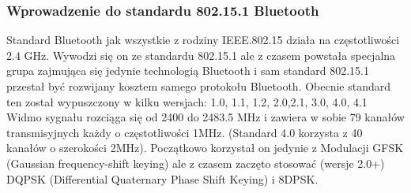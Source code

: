 \subsubsection{Wprowadzenie do standardu 802.15.1 Bluetooth}

\par
\tab Standard Bluetooth jak wszystkie z rodziny IEEE.802.15 działa na częstotliwości 2.4 GHz. Wywodzi się on ze standardu 802.15.1 ale z czasem powstała specjalna grupa zajmująca się jedynie technologią Bluetooth i sam standard 802.15.1 przestał być rozwijany kosztem samego protokołu Bluetooth. Obecnie standard ten został wypuszczony w kilku wersjach: 1.0, 1.1, 1.2, 2.0,2.1, 3.0, 4.0, 4.1\\
Widmo sygnału rozciąga się od 2400 do 2483.5 MHz i zawiera w sobie 79 kanałów transmisyjnych każdy o częstotliwości 1MHz. (Standard 4.0 korzysta z 40 kanałów o szerokości 2MHz). Początkowo korzystał on jedynie z Modulacji GFSK (Gaussian frequency-shift keying) ale z czasem zaczęto stosować (wersje 2.0+) DQPSK  (Differential Quaternary Phase Shift Keying) i 8DPSK. \\

